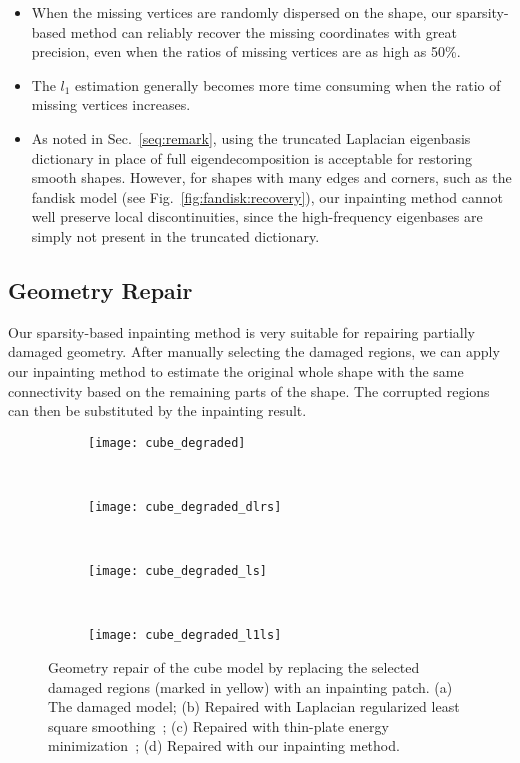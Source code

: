\begin{itemize}
  \item When the missing vertices are randomly dispersed on the shape, our sparsity-based method can
        reliably recover the missing coordinates with great precision, even when the ratios of missing vertices are as high as 50\%.
  \item The $l_1$ estimation generally becomes more time consuming when the ratio of missing vertices increases.
  \item As noted in Sec.~\ref{seq:remark}, using the truncated Laplacian eigenbasis dictionary in place of full eigendecomposition is
        acceptable for restoring smooth shapes. However, for shapes with many edges and corners, such as the fandisk model
        (see Fig.~\ref{fig:fandisk:recovery}), our inpainting method cannot well preserve local discontinuities, since the
        high-frequency eigenbases are simply not present in the truncated dictionary.
\end{itemize}

\subsection{Geometry Repair}
Our sparsity-based inpainting method is very suitable for repairing partially damaged geometry. After manually selecting the damaged regions,
we can apply our inpainting method to estimate the original whole shape with the same connectivity based on the remaining parts of the shape.
The corrupted regions can then be substituted by the inpainting result.

\begin{figure}
    \centering
    \begin{subfigure}[b]{0.23\linewidth}
        \texttt{[image: cube\_degraded]}
        \caption{}
    \end{subfigure}%
    ~
    \begin{subfigure}[b]{0.23\linewidth}
        \texttt{[image: cube\_degraded\_dlrs]}
        \caption{}
    \end{subfigure}
    ~
    \begin{subfigure}[b]{0.23\linewidth}
        \texttt{[image: cube\_degraded\_ls]}
        \caption{}
    \end{subfigure}
    ~
    \begin{subfigure}[b]{0.23\linewidth}
        \texttt{[image: cube\_degraded\_l1ls]}
        \caption{}
    \end{subfigure}
\caption {Geometry repair of the cube model by replacing the selected damaged regions (marked in yellow) with an inpainting patch.
         (a) The damaged model; (b) Repaired with Laplacian regularized least square smoothing~\cite{Nealen2006};
         (c) Repaired with thin-plate energy minimization~\cite{Bac2008};
         (d) Repaired with our inpainting method. }
\label{fig:repair:cube}
\end{figure}

